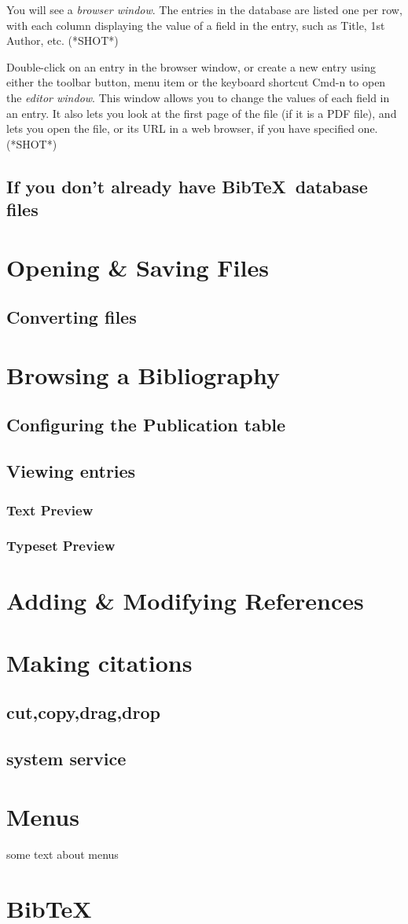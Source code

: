 \documentclass[11pt]{book}
\begin{document}
You will see a \emph{browser window}. The entries in the database are listed one per row, with each column displaying the value of a field in the entry, such as Title, 1st Author, etc. (*SHOT*) 

Double-click on an entry in the browser window, or create a new entry using either the toolbar button, menu item or the keyboard shortcut Cmd-n to open the \emph{editor window}. This window allows you to change the values of each field in an entry. It also lets you look at the first page of the file (if it is a PDF file), and lets you open the file, or its URL in a web browser, if you have specified one. (*SHOT*)

\section{If you don't already have Bib\TeX~database files}\label{qs:nohave}

\chapter{Opening \& Saving Files}
    \section{Converting files}
\chapter{Browsing a Bibliography}
    \section{Configuring the Publication table}
    \section{Viewing entries}
	\subsection{Text Preview}
	\subsection{Typeset Preview}
\chapter{Adding \& Modifying References}
\chapter{Making citations}
	\section{cut,copy,drag,drop}
	\section{system service}

\appendix
\chapter{Menus}
some text about menus
\chapter{Bib\TeX}

\printindex

 
\end{document}
